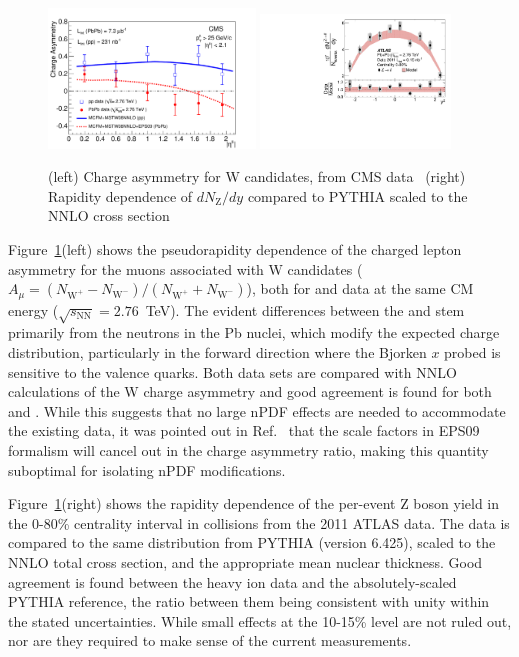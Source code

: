 \begin{figure}[!th]
\begin{center}
\includegraphics[width=0.49\textwidth]{electroweak_figs/Fig3.pdf}
\includegraphics[width=0.45\textwidth]{electroweak_figs/fig_02.pdf}
\caption[]{(left) Charge asymmetry for W candidates, from CMS data~\cite{Chatrchyan:2012nt} (right) Rapidity dependence of $dN_{\mathrm{Z}}/dy$ compared to PYTHIA scaled to the NNLO cross section~\cite{Aad:2012ew}}
\label{fig:pas:zw_eta}
\end{center}
\end{figure}
Figure~\ref{fig:pas:zw_eta}(left) shows the pseudorapidity dependence of the charged lepton asymmetry for the muons associated with
W candidates ($A_\mu = (N_{\mathrm{W}^+}-N_{\mathrm{W}^-})/(N_{\mathrm{W}^+}+N_{\mathrm{W}^-})$), both for \PbPb and \pp data at the same CM energy
($\sqrt{s_\mathrm{NN}}=2.76$~TeV).  The evident differences between the \PbPb and \pp stem primarily from the neutrons in the
Pb nuclei, which modify the expected charge distribution, particularly in the forward direction where the Bjorken $x$ probed
is sensitive to the valence quarks.
Both data sets are compared with NNLO calculations of the W charge asymmetry and good agreement is found for both \pp and \PbPb.
While this suggests that no large nPDF effects are needed to accommodate the existing data, it was pointed out in Ref.~\cite{Paukkunen:2010qg}
that the scale factors in EPS09 formalism will cancel out in the charge asymmetry ratio, making this quantity suboptimal for
isolating nPDF modifications.

Figure~\ref{fig:pas:zw_eta}(right) shows the rapidity dependence of the per-event
Z boson yield in the 0-80\% centrality interval in \PbPb collisions
from the 2011 ATLAS \PbPb data.
The data is compared to the same distribution from PYTHIA (version 6.425), scaled to the NNLO total cross section,
and the appropriate mean nuclear thickness.
Good agreement is found between the heavy ion data and the absolutely-scaled PYTHIA reference, the ratio between them being consistent
with unity within the stated uncertainties.  While small effects at the 10-15\% level are not ruled out, nor are they required to
make sense of the current measurements.

